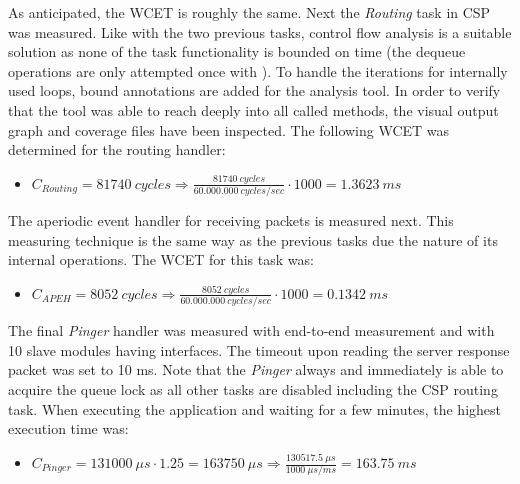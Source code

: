 As anticipated, the WCET is roughly the same. Next the \textit{Routing} task in CSP was measured. Like with the two previous tasks, control flow analysis is a suitable solution as none of the task functionality is bounded on time (the dequeue operations are only attempted once with ). To handle the iterations for internally used loops, bound annotations are added for the analysis tool. In order to verify that the tool was able to reach deeply into all called methods, the visual output graph and coverage files have been inspected. The following WCET was determined for the routing handler:

\begin{itemize}
	\item $C_{Routing} = 81740\ cycles \Rightarrow \frac{81740\ cycles}{60.000.000\ cycles/sec} \cdot 1000 = 1.3623\ ms$
\end{itemize}

The aperiodic event handler for receiving packets is measured next. This measuring technique is the same way as the previous tasks due the nature of its internal operations. The WCET for this task was:

\begin{itemize}
	\item $C_{APEH} = 8052\ cycles \Rightarrow \frac{8052\ cycles}{60.000.000\ cycles/sec} \cdot 1000 = 0.1342\ ms$
\end{itemize}

The final \textit{Pinger} handler was measured with end-to-end measurement and with 10 slave modules having \iic interfaces. The timeout upon reading the server response packet was set to 10 ms. Note that the \textit{Pinger} always and immediately is able to acquire the queue lock as all other tasks are disabled including the CSP routing task. When executing the application and waiting for a few minutes, the highest execution time was:

\begin{itemize}
	\item $C_{Pinger} = 131000\ \mu s \cdot 1.25 = 163750\ \mu s \Rightarrow \frac{130517.5\ \mu s}{1000\ \mu s /ms} = 163.75\ ms$
\end{itemize}
